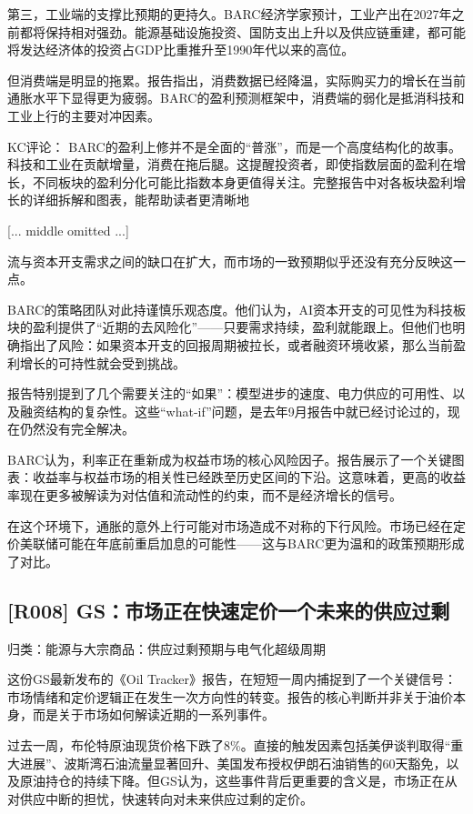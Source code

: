 \documentclass[11pt]{ctexart}
\begin{document}
第三，工业端的支撑比预期的更持久。BARC经济学家预计，工业产出在2027年之前都将保持相对强劲。能源基础设施投资、国防支出上升以及供应链重建，都可能将发达经济体的投资占GDP比重推升至1990年代以来的高位。

但消费端是明显的拖累。报告指出，消费数据已经降温，实际购买力的增长在当前通胀水平下显得更为疲弱。BARC的盈利预测框架中，消费端的弱化是抵消科技和工业上行的主要对冲因素。

KC评论： BARC的盈利上修并不是全面的“普涨”，而是一个高度结构化的故事。科技和工业在贡献增量，消费在拖后腿。这提醒投资者，即使指数层面的盈利在增长，不同板块的盈利分化可能比指数本身更值得关注。完整报告中对各板块盈利增长的详细拆解和图表，能帮助读者更清晰地

[... middle omitted ...]

流与资本开支需求之间的缺口在扩大，而市场的一致预期似乎还没有充分反映这一点。

BARC的策略团队对此持谨慎乐观态度。他们认为，AI资本开支的可见性为科技板块的盈利提供了“近期的去风险化”——只要需求持续，盈利就能跟上。但他们也明确指出了风险：如果资本开支的回报周期被拉长，或者融资环境收紧，那么当前盈利增长的可持性就会受到挑战。

报告特别提到了几个需要关注的“如果”：模型进步的速度、电力供应的可用性、以及融资结构的复杂性。这些“what-if”问题，是去年9月报告中就已经讨论过的，现在仍然没有完全解决。

BARC认为，利率正在重新成为权益市场的核心风险因子。报告展示了一个关键图表：收益率与权益市场的相关性已经跌至历史区间的下沿。这意味着，更高的收益率现在更多被解读为对估值和流动性的约束，而不是经济增长的信号。

在这个环境下，通胀的意外上行可能对市场造成不对称的下行风险。市场已经在定价美联储可能在年底前重启加息的可能性——这与BARC更为温和的政策预期形成了对比。

\subsection{[R008] GS：市场正在快速定价一个未来的供应过剩}
{\small\color{refgray}归类：能源与大宗商品：供应过剩预期与电气化超级周期}

这份GS最新发布的《Oil Tracker》报告，在短短一周内捕捉到了一个关键信号：市场情绪和定价逻辑正在发生一次方向性的转变。报告的核心判断并非关于油价本身，而是关于市场如何解读近期的一系列事件。

过去一周，布伦特原油现货价格下跌了8\%。直接的触发因素包括美伊谈判取得“重大进展”、波斯湾石油流量显著回升、美国发布授权伊朗石油销售的60天豁免，以及原油持仓的持续下降。但GS认为，这些事件背后更重要的含义是，市场正在从对供应中断的担忧，快速转向对未来供应过剩的定价。
\end{document}
